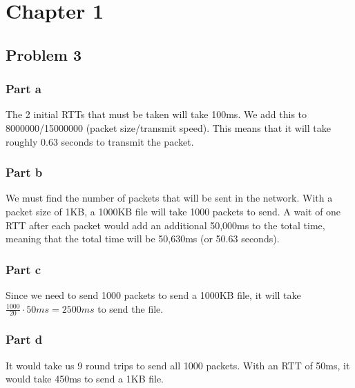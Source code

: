 \documentclass{article}%
\begin{document}
\section*{Chapter 1}
\subsection*{Problem 3}

\subsubsection*{Part a}
The 2 initial RTTs that must be taken will take 100ms. We add this to 8000000/15000000 (packet size/transmit speed). This means that it will take
roughly 0.63 seconds to transmit the packet.

\subsubsection*{Part b}
We must find the number of packets that will be sent in the network. With a packet size of 1KB, a 1000KB file will take 1000 packets to send. A
wait of one RTT after each packet would add an additional 50,000ms to the total time, meaning that the total time will be 50,630ms (or 50.63 seconds).

\subsubsection*{Part c}
Since we need to send 1000 packets to send a 1000KB file, it will take $\frac{1000}{20} \cdot 50ms = 2500ms$ to send the file.

\subsubsection*{Part d}
It would take us 9 round trips to send all 1000 packets. With an RTT of 50ms, it would take 450ms to send a 1KB file.
\end{document}
